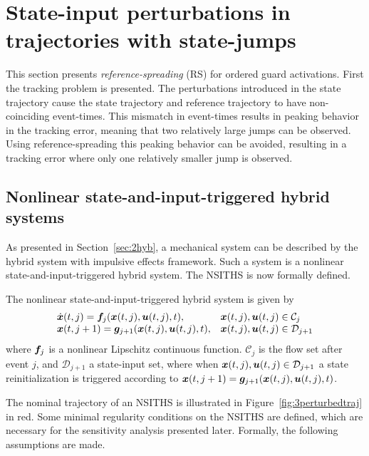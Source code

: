 \documentclass[../DC2017114Bouma.tex]{subfiles}
\begin{document}
\section{State-input perturbations in trajectories with state-jumps}
This section presents \textit{reference-spreading} (RS) for ordered guard activations. First the tracking problem is presented. The perturbations introduced in the state trajectory cause the state trajectory and reference trajectory to have non-coinciding event-times. This mismatch in event-times results in peaking behavior in the tracking error, meaning that two relatively large jumps can be observed. Using reference-spreading this peaking behavior can be avoided, resulting in a tracking error where only one relatively smaller jump is observed.
%

\subsection{Nonlinear state-and-input-triggered hybrid systems}
As presented in Section~\ref{sec:2hyb}, a mechanical system can be described by the hybrid system with impulsive effects framework. Such a system is a nonlinear state-and-input-triggered hybrid system. The NSITHS is now formally defined.

\begin{mydef}[NSITHS]\label{def:3nsiths}
The nonlinear state-and-input-triggered hybrid system is given by
\begin{equation}
\begin{array}{ll}
\dot{{\boldsymbol{x}}}(t,j) ={\boldsymbol{f}}_j({\boldsymbol{x}}(t,j),{\boldsymbol{u}}(t,j),t),& {\boldsymbol{x}}(t,j),{\boldsymbol{u}}(t,j)\in \mathcal{C}_j\\
{\boldsymbol{x}}(t,j+1) = {\boldsymbol{g}}_{j+1}({\boldsymbol{x}}(t,j),{\boldsymbol{u}}(t,j),t),& {\boldsymbol{x}}(t,j),{\boldsymbol{u}}(t,j)\in \mathcal{D}_{j+1}
\end{array}\label{eq:3hybimp}
\end{equation}
where ${\boldsymbol{f}}_j$ is a nonlinear Lipschitz continuous function. $\mathcal{C}_j$ is the flow set after event $j$, and $\mathcal{D}_{j+1}$ a state-input set, where when ${\boldsymbol{x}}(t,j),{\boldsymbol{u}}(t,j)\in \mathcal{D}_{j+1}$ a state reinitialization is triggered according to ${\boldsymbol{x}}(t,j+1) = {\boldsymbol{g}}_{j+1}({\boldsymbol{x}}(t,j),{\boldsymbol{u}}(t,j),t)$.
\end{mydef} 

The nominal trajectory of an NSITHS is illustrated in Figure~\ref{fig:3perturbedtraj} in red. Some minimal regularity conditions on the NSITHS are defined, which are necessary for the sensitivity analysis presented later. Formally, the following assumptions are made.
\end{document}
